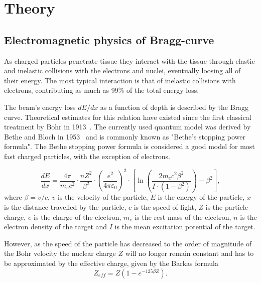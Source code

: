 

\clearpage
\section{Theory}

\subsection{Electromagnetic physics of Bragg-curve}
As charged particles penetrate tissue they interact with the tissue through elastic and inelastic collisions with the electrons and nuclei, eventually loosing all of their energy. The most typical interaction is that of inelastic collisions with electrons, contributing as much as 99\% of the total energy loss.

The beam's energy loss $dE/dx$ as a function of depth is described by the Bragg curve. %
 Theoretical estimates for this relation have existed since the first classical treatment by Bohr in 1913~\cite{bohr13}. The currently used quantum model was derived by Bethe and Bloch in 1953~\cite{bethebloch53}  and is commonly known as "Bethe's stopping power formula". The Bethe stopping power formula is considered a good model for most fast charged particles, with the exception of electrons.

\begin{equation}
 \frac{dE}{dx} = \frac{4 \pi}{m_e c^2} \cdot \frac{nZ^2}{\beta^2} \cdot \left(\frac{e^2}{4\pi\varepsilon_0}\right)^2 \cdot \left[\ln \left(\frac{2m_e c^2 \beta^2}{I \cdot (1-\beta^2)}\right) - \beta^2\right],
\label{bethebloch}
\end{equation}
where $\beta = v/c $, 
$v$ is the velocity of the particle,
$E$ is the 
energy of the particle,
$x$ is the 
distance travelled by the particle,
$c$ is the 
speed of light,
$Z$ is the 
particle charge,
$e$ is the 
charge of the electron,
$m_e$ is the 
rest mass of the electron,
$n$ is the 
electron density of the target and 
$I$  is the 
mean excitation potential of the target.


However, as the speed of the particle has decreased to the order of magnitude of the Bohr velocity the nuclear charge $Z$ will no longer remain constant and has to be approximated by the effective charge, given by the Barkas formula \begin{equation}Z_{eff} = Z(1-e^{-125 \beta Z}).\end{equation}

